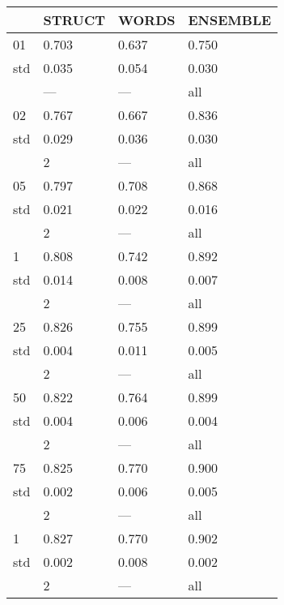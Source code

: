 \begin{tabular}{llll}
\toprule
     & STRUCT   & WORDS   & ENSEMBLE   \\
\midrule
 01  & 0.703    & 0.637   & 0.750      \\
 std & 0.035    & 0.054   & 0.030      \\
     & ---      & ---     & all        \\
 02  & 0.767    & 0.667   & 0.836      \\
 std & 0.029    & 0.036   & 0.030      \\
     & 2        & ---     & all        \\
 05  & 0.797    & 0.708   & 0.868      \\
 std & 0.021    & 0.022   & 0.016      \\
     & 2        & ---     & all        \\
 1   & 0.808    & 0.742   & 0.892      \\
 std & 0.014    & 0.008   & 0.007      \\
     & 2        & ---     & all        \\
 25  & 0.826    & 0.755   & 0.899      \\
 std & 0.004    & 0.011   & 0.005      \\
     & 2        & ---     & all        \\
 50  & 0.822    & 0.764   & 0.899      \\
 std & 0.004    & 0.006   & 0.004      \\
     & 2        & ---     & all        \\
 75  & 0.825    & 0.770   & 0.900      \\
 std & 0.002    & 0.006   & 0.005      \\
     & 2        & ---     & all        \\
 1   & 0.827    & 0.770   & 0.902      \\
 std & 0.002    & 0.008   & 0.002      \\
     & 2        & ---     & all        \\
\bottomrule
\end{tabular}
